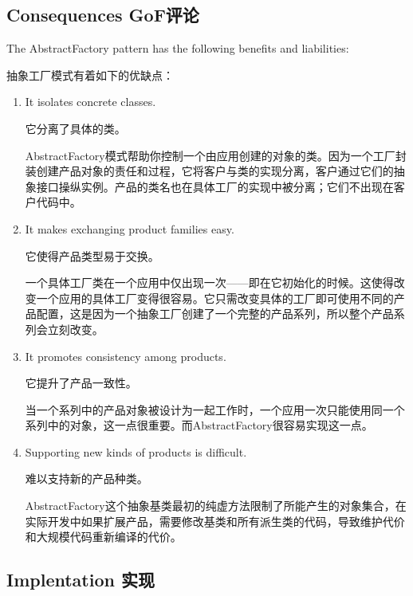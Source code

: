 \subsection{Consequences GoF评论}

The AbstractFactory pattern has the following benefits and liabilities:

抽象工厂模式有着如下的优缺点：

\begin{enumerate}

\item It isolates concrete classes.

	  它分离了具体的类。

	  AbstractFactory模式帮助你控制一个由应用创建的对象的类。因为一个工厂封装创建产品对象的责任和过程，它将客户与类的实现分离，客户通过它们的抽象接口操纵实例。产品的类名也在具体工厂的实现中被分离；它们不出现在客户代码中。

\item It makes exchanging product families easy.

      它使得产品类型易于交换。 

	  一个具体工厂类在一个应用中仅出现一次——即在它初始化的时候。这使得改变一个应用的具体工厂变得很容易。它只需改变具体的工厂即可使用不同的产品配置，这是因为一个抽象工厂创建了一个完整的产品系列，所以整个产品系列会立刻改变。

\item It promotes consistency among products.

	  它提升了产品一致性。

	  当一个系列中的产品对象被设计为一起工作时，一个应用一次只能使用同一个系列中的对象，这一点很重要。而AbstractFactory很容易实现这一点。

\item Supporting new kinds of products is difficult.

	  难以支持新的产品种类。	

      AbstractFactory这个抽象基类最初的纯虚方法限制了所能产生的对象集合，在实际开发中如果扩展产品，需要修改基类和所有派生类的代码，导致维护代价和大规模代码重新编译的代价。
\end{enumerate}

\subsection{Implentation 实现}

